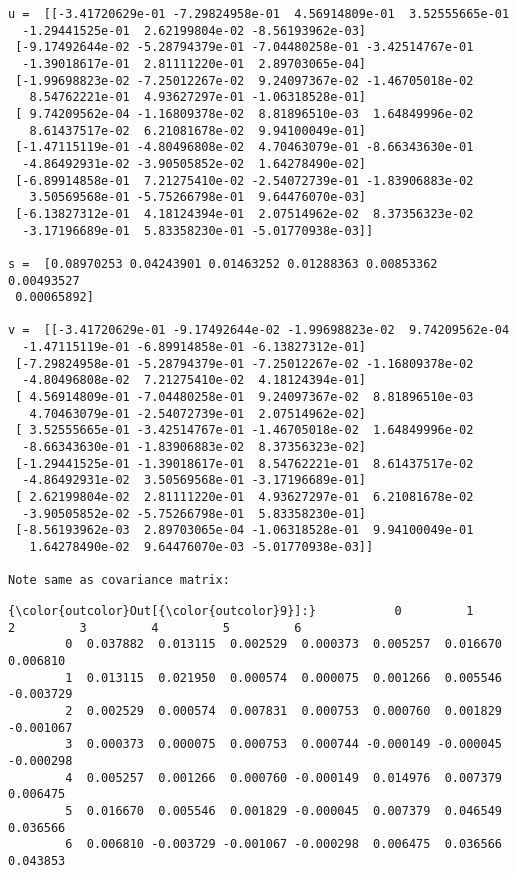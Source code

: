 \documentclass[11pt]{article}
\begin{document}
    \begin{Verbatim}[commandchars=\\\{\}]
u =  [[-3.41720629e-01 -7.29824958e-01  4.56914809e-01  3.52555665e-01
  -1.29441525e-01  2.62199804e-02 -8.56193962e-03]
 [-9.17492644e-02 -5.28794379e-01 -7.04480258e-01 -3.42514767e-01
  -1.39018617e-01  2.81111220e-01  2.89703065e-04]
 [-1.99698823e-02 -7.25012267e-02  9.24097367e-02 -1.46705018e-02
   8.54762221e-01  4.93627297e-01 -1.06318528e-01]
 [ 9.74209562e-04 -1.16809378e-02  8.81896510e-03  1.64849996e-02
   8.61437517e-02  6.21081678e-02  9.94100049e-01]
 [-1.47115119e-01 -4.80496808e-02  4.70463079e-01 -8.66343630e-01
  -4.86492931e-02 -3.90505852e-02  1.64278490e-02]
 [-6.89914858e-01  7.21275410e-02 -2.54072739e-01 -1.83906883e-02
   3.50569568e-01 -5.75266798e-01  9.64476070e-03]
 [-6.13827312e-01  4.18124394e-01  2.07514962e-02  8.37356323e-02
  -3.17196689e-01  5.83358230e-01 -5.01770938e-03]] 

s =  [0.08970253 0.04243901 0.01463252 0.01288363 0.00853362 0.00493527
 0.00065892] 

v =  [[-3.41720629e-01 -9.17492644e-02 -1.99698823e-02  9.74209562e-04
  -1.47115119e-01 -6.89914858e-01 -6.13827312e-01]
 [-7.29824958e-01 -5.28794379e-01 -7.25012267e-02 -1.16809378e-02
  -4.80496808e-02  7.21275410e-02  4.18124394e-01]
 [ 4.56914809e-01 -7.04480258e-01  9.24097367e-02  8.81896510e-03
   4.70463079e-01 -2.54072739e-01  2.07514962e-02]
 [ 3.52555665e-01 -3.42514767e-01 -1.46705018e-02  1.64849996e-02
  -8.66343630e-01 -1.83906883e-02  8.37356323e-02]
 [-1.29441525e-01 -1.39018617e-01  8.54762221e-01  8.61437517e-02
  -4.86492931e-02  3.50569568e-01 -3.17196689e-01]
 [ 2.62199804e-02  2.81111220e-01  4.93627297e-01  6.21081678e-02
  -3.90505852e-02 -5.75266798e-01  5.83358230e-01]
 [-8.56193962e-03  2.89703065e-04 -1.06318528e-01  9.94100049e-01
   1.64278490e-02  9.64476070e-03 -5.01770938e-03]] 

Note same as covariance matrix:

    \end{Verbatim}

\begin{Verbatim}[commandchars=\\\{\}]
{\color{outcolor}Out[{\color{outcolor}9}]:}           0         1         2         3         4         5         6
        0  0.037882  0.013115  0.002529  0.000373  0.005257  0.016670  0.006810
        1  0.013115  0.021950  0.000574  0.000075  0.001266  0.005546 -0.003729
        2  0.002529  0.000574  0.007831  0.000753  0.000760  0.001829 -0.001067
        3  0.000373  0.000075  0.000753  0.000744 -0.000149 -0.000045 -0.000298
        4  0.005257  0.001266  0.000760 -0.000149  0.014976  0.007379  0.006475
        5  0.016670  0.005546  0.001829 -0.000045  0.007379  0.046549  0.036566
        6  0.006810 -0.003729 -0.001067 -0.000298  0.006475  0.036566  0.043853
\end{Verbatim}
            
\end{document}
